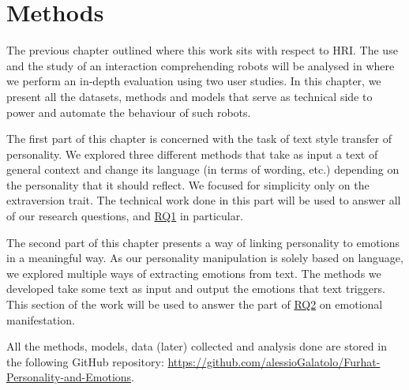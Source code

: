 \documentclass[nomenclature, english, biblatex]{kththesis}
\begin{document}
\chapter{Methods}
\label{ch:methods}
The previous chapter outlined where this work sits with respect to \gls{HRI}. The use and the study of an interaction comprehending robots will be analysed in  where we perform an in-depth evaluation using two user studies. In this chapter, we present all the datasets, methods and models that serve as technical side to power and automate the behaviour of such robots.

The first part of this chapter is concerned with the task of text style transfer of personality. We explored three different methods that take as input a text of general context and change its language (in terms of wording, etc.) depending on the personality that it should reflect. We focused for simplicity only on the extraversion trait. The technical work done in this part will be used to answer all of our research questions, and \hyperlink{rqs:1}{RQ1} in particular.

The second part of this chapter presents a way of linking personality to emotions in a meaningful way. As our personality manipulation is solely based on language, we explored multiple ways of extracting emotions from text. The methods we developed take some text as input and output the emotions that text triggers. This section of the work will be used to answer the part of \hyperlink{rqs:2}{RQ2} on emotional manifestation.

All the methods, models, data (later) collected and analysis done are stored in the following GitHub repository: \url{https://github.com/alessioGalatolo/Furhat-Personality-and-Emotions}.
\end{document}
